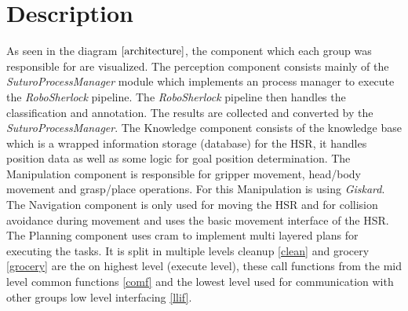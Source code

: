 \documentclass[main.tex]{subfiles}
\begin{document}
		\section{Description}
			As seen in the diagram \(\ref{architecture}\), the component which each group was responsible for are visualized. The perception component consists mainly of the \textit{SuturoProcessManager} module which implements an process manager to execute the \textit{RoboSherlock} pipeline. The \textit{RoboSherlock} pipeline then handles the classification and annotation. The results are collected and converted by the \textit{SuturoProcessManager}.  The Knowledge component consists of the knowledge base which is a wrapped information storage (database) for the HSR, it handles position data as well as some logic for goal position determination. The Manipulation component is responsible for gripper movement, head/body movement and grasp/place operations. For this Manipulation is using \textit{Giskard}. The Navigation component is only used for moving the HSR and for collision avoidance during movement and uses the basic movement interface of the HSR. The Planning component uses cram to implement multi layered plans for executing the tasks. It is split in multiple levels cleanup \ref{clean} and grocery \ref{grocery} are the on highest level (execute level), these call functions from the mid level common functions \ref{comf} and the lowest level used for communication with other groups low level interfacing \ref{llif}.
\end{document}
